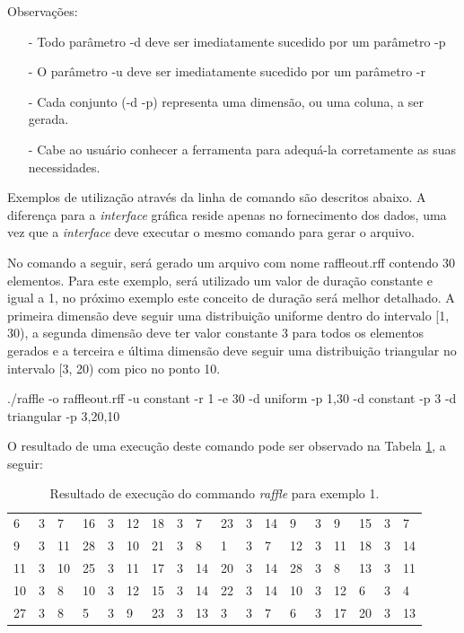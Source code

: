 Observações:
\begin{itemize}
    \item[-] Todo parâmetro -d deve ser imediatamente sucedido por um parâmetro -p
    \item[-] O parâmetro -u deve ser imediatamente sucedido por um parâmetro -r
    \item[-] Cada conjunto (-d -p) representa uma dimensão, ou uma coluna, a ser gerada.
    \item[-] Cabe ao usuário conhecer a ferramenta para adequá-la corretamente as suas necessidades.
\end{itemize}

Exemplos de utilização através da linha de comando são descritos abaixo. A diferença para a \emph{interface} gráfica reside apenas no fornecimento dos dados, uma vez que a \emph{interface} deve executar o mesmo comando para gerar o arquivo.

No comando a seguir, será gerado um arquivo com nome raffleout.rff contendo 30 elementos. Para este exemplo, será utilizado um valor de duração constante e igual a 1, no próximo exemplo este conceito de duração será melhor detalhado. A primeira dimensão deve seguir uma distribuição uniforme dentro do intervalo [1, 30), a segunda dimensão deve ter valor constante 3 para todos os elementos gerados e a terceira e última dimensão deve seguir uma distribuição triangular no intervalo [3, 20) com pico no ponto 10.

./raffle -o raffleout.rff -u constant -r 1 -e 30 -d uniform -p 1,30 -d constant -p 3 -d triangular -p 3,20,10

O resultado de uma execução deste comando pode ser observado na Tabela \ref{tab:raffleresult1}, a seguir:

\begin{table}[!h]
	\centering
	\caption{Resultado de execução do commando \emph{raffle} para exemplo 1.}
	\label{tab:raffleresult1}
	\begin{tabular}{|lll|lll|lll|lll|lll|lll|}
		\hline
		 6 & 3 &  7 & 16 & 3 & 12 & 18 & 3 &  7 & 23 & 3 & 14 &  9 & 3 &  9 & 15 & 3 &  7 \\
		 9 & 3 & 11 & 28 & 3 & 10 & 21 & 3 &  8 &  1 & 3 &  7 & 12 & 3 & 11 & 18 & 3 & 14 \\
		11 & 3 & 10 & 25 & 3 & 11 & 17 & 3 & 14 & 20 & 3 & 14 & 28 & 3 &  8 & 13 & 3 & 11 \\
		10 & 3 &  8 & 10 & 3 & 12 & 15 & 3 & 14 & 22 & 3 & 14 & 10 & 3 & 12 &  6 & 3 &  4 \\
		27 & 3 &  8 &  5 & 3 &  9 & 23 & 3 & 13 &  3 & 3 &  7 &  6 & 3 & 17 & 20 & 3 & 13 \\
		\hline
	\end{tabular}
\end{table}


